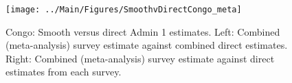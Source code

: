 \documentclass[12pt]{article}\usepackage[]{graphicx}\usepackage[]{color}
\newenvironment{knitrout}{}{} %
\begin{document}

\begin{knitrout}
\color{fgcolor}\begin{figure}[bht]

{\centering \texttt{[image: ../Main/Figures/SmoothvDirectCongo\_meta]} 

}

\caption[Congo]{Congo: Smooth versus direct Admin 1 estimates. Left: Combined (meta-analysis) survey estimate against combined direct estimates. Right: Combined (meta-analysis) survey estimate against direct estimates from each survey.}\label{fig:unnamed-chunk-73}
\end{figure}


\end{knitrout}
\end{document}
